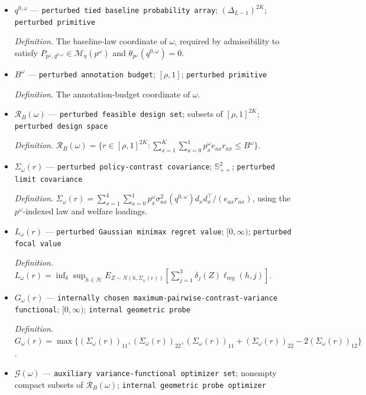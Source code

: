 \documentclass{article}
\begin{document}
\begin{itemize}
  \item \(q^{0,\omega}\) --- \texttt{perturbed tied baseline probability array}; \((\Delta_{L-1})^{2K}\); \texttt{perturbed primitive}
  \par\smallskip\noindent\emph{Definition.} The baseline-law coordinate of \(\omega\), required by admissibility to satisfy \(P_{p^\omega,q^{0,\omega}}\in\mathcal M_\eta(p^\omega)\) and \(\theta_{p^\omega}(q^{0,\omega})=0\).
  \item \(B^\omega\) --- \texttt{perturbed annotation budget}; \([\rho,1]\); \texttt{perturbed primitive}
  \par\smallskip\noindent\emph{Definition.} The annotation-budget coordinate of \(\omega\).
  \item \(\mathcal R_B(\omega)\) --- \texttt{perturbed feasible design set}; subsets of \([\rho,1]^{2K}\); \texttt{perturbed design space}
  \par\smallskip\noindent\emph{Definition.} \(\mathcal R_B(\omega)=\{r\in[\rho,1]^{2K}:\sum_{x=1}^{K}\sum_{a=0}^{1}p_x^\omega e_{ax}r_{ax}\le B^\omega\}\).
  \item \(\Sigma_\omega(r)\) --- \texttt{perturbed policy-\allowbreak{}contrast covariance}; \(\mathbb S_{++}^2\); \texttt{perturbed limit covariance}
  \par\smallskip\noindent\emph{Definition.} \(\Sigma_\omega(r)=\sum_{x=1}^{4}\sum_{a=0}^{1}p_x^\omega\sigma^2_{ax}(q^{0,\omega})d_xd_x^\top/(e_{ax}r_{ax})\), using the \(p^\omega\)-indexed law and welfare loadings.
  \item \(L_\omega(r)\) --- \texttt{perturbed Gaussian minimax regret value}; \([0,\infty)\); \texttt{perturbed focal value}
  \par\smallskip\noindent\emph{Definition.} \(L_\omega(r)=\inf_\delta\sup_{h\in\mathcal H}E_{Z\sim N(h,\Sigma_\omega(r))}[\sum_{j=1}^{3}\delta_j(Z)\ell_{\mathrm{reg}}(h,j)]\).
  \item \(G_\omega(r)\) --- \texttt{internally chosen maximum-\allowbreak{}pairwise-\allowbreak{}contrast-\allowbreak{}variance functional}; \([0,\infty)\); \texttt{internal geometric probe}
  \par\smallskip\noindent\emph{Definition.} \(G_\omega(r)=\max\{(\Sigma_\omega(r))_{11},(\Sigma_\omega(r))_{22},(\Sigma_\omega(r))_{11}+(\Sigma_\omega(r))_{22}-2(\Sigma_\omega(r))_{12}\}\).
  \item \(\mathcal G(\omega)\) --- \texttt{auxiliary variance-\allowbreak{}functional optimizer set}; nonempty compact subsets of \(\mathcal R_B(\omega)\); \texttt{internal geometric probe optimizer}

\end{itemize}
\end{document}
